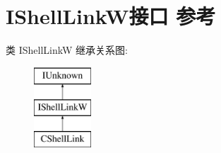 \hypertarget{interface_i_shell_link_w}{}\section{I\+Shell\+Link\+W接口 参考}
\label{interface_i_shell_link_w}
类 I\+Shell\+LinkW 继承关系图\+:\begin{figure}[H]
\begin{center}
\leavevmode
\includegraphics[height=3.000000cm]{interface_i_shell_link_w}
\end{center}
\end{figure}

